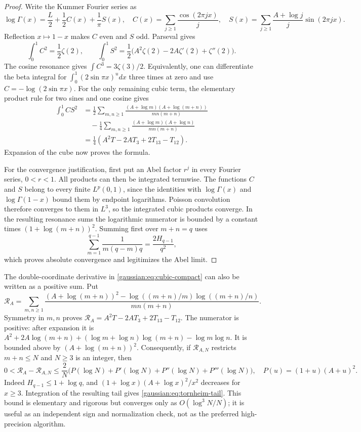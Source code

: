\begin{proof}
Write the Kummer Fourier series as
\[
 \log\Gamma(x)=\frac L2+\frac12 C(x)+\frac1\pi S(x),
 \quad C(x)=\sum_{j\ge1}\frac{\cos(2\pi jx)}j,
 \quad S(x)=\sum_{j\ge1}\frac{A+\log j}{j}\sin(2\pi jx).
\]
Reflection $x\mapsto1-x$ makes $C$ even and $S$ odd.  Parseval gives
\[
 \int_0^1 C^2=\frac12\zeta(2),\qquad
 \int_0^1 S^2=\frac12\bigl(A^2\zeta(2)-2A\zeta'(2)+\zeta''(2)\bigr).
\]
The cosine resonance gives $\int C^3=3\zeta(3)/2$.  Equivalently, one can
differentiate the beta integral for $\int_0^1(2\sin\pi x)^u dx$ three times
at zero and use $C=-\log(2\sin\pi x)$.
For the only remaining cubic term, the elementary product rule for two sines
and one cosine gives
\begin{align*}
 \int_0^1 CS^2
 &=\frac12\sum_{m,n\ge1}
   \frac{(A+\log m)(A+\log(m+n))}{mn(m+n)}\\
 &\hspace{1em}-\frac14\sum_{m,n\ge1}
   \frac{(A+\log m)(A+\log n)}{mn(m+n)}\\
 &=\frac14\left(A^2T-2AT_3+2T_{13}-T_{12}\right).
\end{align*}
Expansion of the cube now proves the formula.

For the convergence justification, first put an Abel factor $r^j$ in every
Fourier series, $0<r<1$.  All products can then be integrated termwise.
The functions $C$ and $S$ belong to every finite $L^p(0,1)$, since the
identities with $\log\Gamma(x)$ and $\log\Gamma(1-x)$ bound them by
endpoint logarithms.  Poisson convolution therefore converges to them in
$L^3$, so the integrated cubic products converge.  In the resulting
resonance sums the logarithmic numerator is bounded by a constant times
$(1+\log(m+n))^2$.  Summing first over $m+n=q$ uses
\[
 \sum_{m=1}^{q-1}\frac{1}{m(q-m)q}=\frac{2H_{q-1}}{q^2},
\]
which proves absolute convergence and legitimizes the Abel limit.
\end{proof}

The double-coordinate derivative in \eqref{gaussian:eq:cubic-compact} can also be
written as a positive sum.  Put
\[
 \mathcal R_A=\sum_{m,n\ge1}
 \frac{(A+\log(m+n))^2-
 \log((m+n)/m)\log((m+n)/n)}{mn(m+n)}.
\]
Symmetry in $m,n$ proves
$\mathcal R_A=A^2T-2AT_3+2T_{13}-T_{12}$.
The numerator is positive: after expansion it is
$A^2+2A\log(m+n)+(\log m+\log n)\log(m+n)-\log m\log n$.
It is bounded above by $(A+\log(m+n))^2$.
Consequently, if $\mathcal R_{A,N}$ restricts $m+n\le N$ and $N\ge3$ is an integer, then
\begin{equation}
 0<\mathcal R_A-\mathcal R_{A,N}
 \le\frac2N\bigl(P(\log N)+P'(\log N)+P''(\log N)+P'''(\log N)\bigr),
 \quad P(u)=(1+u)(A+u)^2.
 \label{gaussian:eq:tornheim-tail}
\end{equation}
Indeed $H_{q-1}\le1+\log q$, and
$(1+\log x)(A+\log x)^2/x^2$ decreases for $x\ge3$.
Integration of the resulting tail gives \eqref{gaussian:eq:tornheim-tail}.
This bound is elementary and rigorous but converges only as
$O(\log^3N/N)$; it is useful as an independent sign and normalization check,
not as the preferred high-precision algorithm.

